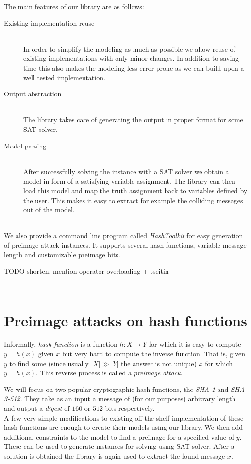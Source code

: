 \documentclass[myposter,portrait]{sciposter}
\def\mysection#1{
{\color{sectionCol}\section*{\sc\bfseries #1}}}
\begin{document}
\begin{multicols*}{3}
The main features of our library are as follows:

\begin{description}
\item[Existing implementation reuse]~\\
In order to simplify the modeling as much as possible we allow reuse of existing implementations with only minor changes.
In addition to saving time this also makes the modeling less error-prone as we can build upon a well tested implementation.

\item[Output abstraction]~\\
The library takes care of generating the output in proper format for some SAT solver.

\item[Model parsing]~\\
After successfully solving the instance with a SAT solver we obtain a model in form of a satisfying variable assignment.
The library can then load this model and map the truth assignment back to variables defined by the user.
This makes it easy to extract for example the colliding messages out of the model.
\end{description}
~\\

We also provide a command line program called \emph{HashToolkit} for easy generation of preimage attack instances.
It supports several hash functions, variable message length and customizable preimage bits.

TODO shorten, mention operator overloading + tseitin

~\\	
\mysection{Preimage attacks on hash functions}
Informally, \emph{hash function} is a function $h: X \to Y$ for which it is easy to compute $y = h(x)$ given $x$ but very hard to compute the inverse function.
That is, given $y$ to find some (since usually $|X| \gg |Y|$ the answer is not unique) $x$ for which $y = h(x)$.
This reverse process is called a \emph{preimage attack}.

We will focus on two popular cryptographic hash functions, the \emph{SHA-1} and \emph{SHA-3-512}.
They take as an input a message of (for our purposes) arbitrary length and output a \emph{digest} of $160$ or $512$ bits respectively.
~\\

A few very simple modifications to existing off-the-shelf implementation of these hash functions are enough to create their models using our library.
We then add additional constraints to the model to find a preimage for a specified value of $y$.
These can be used to generate instances for solving using SAT solver.
After a solution is obtained the library is again used to extract the found message $x$.


\end{multicols*}
\end{document}
